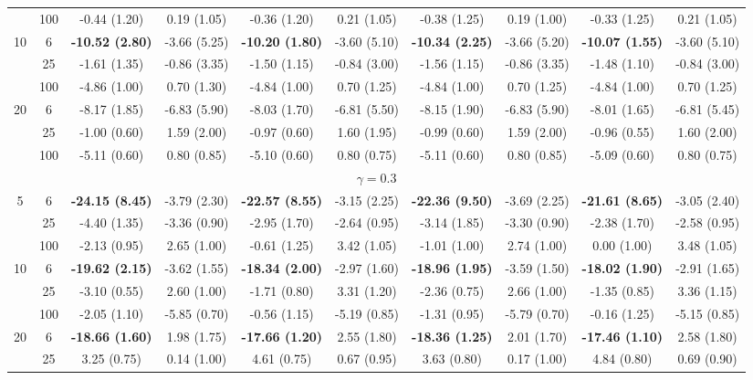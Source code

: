 \documentclass[
  man]{apa6}
\newenvironment{lltable}{\begin{landscape}\centering\begin{ThreePartTable}}{\end{ThreePartTable}\end{landscape}}
\begin{document}
\begin{lltable}
{\begin{longtable}{cccccccccc}
 & 100 & -0.44 (1.20) & 0.19 (1.05) & -0.36 (1.20) & 0.21 (1.05) & -0.38 (1.25) & 0.19 (1.00) & -0.33 (1.25) & 0.21 (1.05)\\
10 & 6 & \textbf{-10.52 (2.80)} & -3.66 (5.25) & \textbf{-10.20 (1.80)} & -3.60 (5.10) & \textbf{-10.34 (2.25)} & -3.66 (5.20) & \textbf{-10.07 (1.55)} & -3.60 (5.10)\\
 & 25 & -1.61 (1.35) & -0.86 (3.35) & -1.50 (1.15) & -0.84 (3.00) & -1.56 (1.15) & -0.86 (3.35) & -1.48 (1.10) & -0.84 (3.00)\\
 & 100 & -4.86 (1.00) & 0.70 (1.30) & -4.84 (1.00) & 0.70 (1.25) & -4.84 (1.00) & 0.70 (1.25) & -4.84 (1.00) & 0.70 (1.25)\\
20 & 6 & -8.17 (1.85) & -6.83 (5.90) & -8.03 (1.70) & -6.81 (5.50) & -8.15 (1.90) & -6.83 (5.90) & -8.01 (1.65) & -6.81 (5.45)\\
 & 25 & -1.00 (0.60) & 1.59 (2.00) & -0.97 (0.60) & 1.60 (1.95) & -0.99 (0.60) & 1.59 (2.00) & -0.96 (0.55) & 1.60 (2.00)\\
 & 100 & -5.11 (0.60) & 0.80 (0.85) & -5.10 (0.60) & 0.80 (0.75) & -5.11 (0.60) & 0.80 (0.85) & -5.09 (0.60) & 0.80 (0.75)\\
\multicolumn{10}{c}{$\gamma = 0.3$}\\
5 & 6 & \textbf{-24.15 (8.45)} & -3.79 (2.30) & \textbf{-22.57 (8.55)} & -3.15 (2.25) & \textbf{-22.36 (9.50)} & -3.69 (2.25) & \textbf{-21.61 (8.65)} & -3.05 (2.40)\\
 & 25 & -4.40 (1.35) & -3.36 (0.90) & -2.95 (1.70) & -2.64 (0.95) & -3.14 (1.85) & -3.30 (0.90) & -2.38 (1.70) & -2.58 (0.95)\\
 & 100 & -2.13 (0.95) & 2.65 (1.00) & -0.61 (1.25) & 3.42 (1.05) & -1.01 (1.00) & 2.74 (1.00) & 0.00 (1.00) & 3.48 (1.05)\\
10 & 6 & \textbf{-19.62 (2.15)} & -3.62 (1.55) & \textbf{-18.34 (2.00)} & -2.97 (1.60) & \textbf{-18.96 (1.95)} & -3.59 (1.50) & \textbf{-18.02 (1.90)} & -2.91 (1.65)\\
 & 25 & -3.10 (0.55) & 2.60 (1.00) & -1.71 (0.80) & 3.31 (1.20) & -2.36 (0.75) & 2.66 (1.00) & -1.35 (0.85) & 3.36 (1.15)\\
 & 100 & -2.05 (1.10) & -5.85 (0.70) & -0.56 (1.15) & -5.19 (0.85) & -1.31 (0.95) & -5.79 (0.70) & -0.16 (1.25) & -5.15 (0.85)\\
20 & 6 & \textbf{-18.66 (1.60)} & 1.98 (1.75) & \textbf{-17.66 (1.20)} & 2.55 (1.80) & \textbf{-18.36 (1.25)} & 2.01 (1.70) & \textbf{-17.46 (1.10)} & 2.58 (1.80)\\
 & 25 & 3.25 (0.75) & 0.14 (1.00) & 4.61 (0.75) & 0.67 (0.95) & 3.63 (0.80) & 0.17 (1.00) & 4.84 (0.80) & 0.69 (0.90)\\

\end{longtable}}
\end{lltable}
\end{document}
